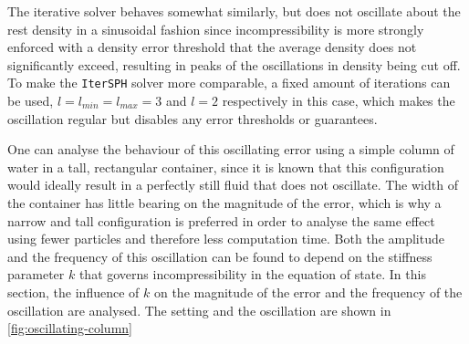 The iterative solver behaves somewhat similarly, but does not oscillate about the rest density in a sinusoidal fashion since incompressibility is more strongly enforced with a density error threshold that the average density does not significantly exceed, resulting in peaks of the oscillations in density being cut off. To make the \texttt{IterSPH} solver more comparable, a fixed amount of iterations can be used, $l=l_{min}=l_{max}=3$ and $l=2$ respectively in this case, which makes the oscillation regular but disables any error thresholds or guarantees.

One can analyse the behaviour of this oscillating error using a simple column of water in a tall, rectangular container, since it is known that this configuration would ideally result in a perfectly still fluid that does not oscillate. The width of the container has little bearing on the magnitude of the error, which is why a narrow and tall configuration is preferred in order to analyse the same effect using fewer particles and therefore less computation time. Both the amplitude and the frequency of this oscillation can be found to depend on the stiffness parameter $k$ that governs incompressibility in the equation of state. In this section, the influence of $k$ on the magnitude of the error and the frequency of the oscillation are analysed. The setting and the oscillation are shown in \autoref{fig:oscillating-column}

